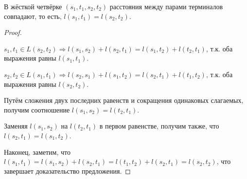 \begin{proposition} \label{eql}
В жёсткой четвёрке $(s_1, t_1, s_2, t_2)$ расстояния между парами терминалов совпадают, то есть, $l(s_1, t_1) = l(s_2, t_2)$.
\end{proposition}
\begin{proof} ~

$s_1, t_1 \in L(s_2, t_2) \Rightarrow l(s_1, s_2) + l(s_2, t_1) = l(s_1, t_2) + l(t_2, t_1)$, т.к. оба выражения равны $l(s_1, t_1)$.

$s_2, t_2 \in L(s_1, t_1) \Rightarrow l(s_2, s_1) + l(s_1, t_2) = l(s_2, t_1) + l(t_1, t_2)$, т.к. оба выражения равны $l(s_2, t_2)$.

Путём сложения двух последних равенств и сокращения одинаковых слагаемых, получим соотношение $l(s_1, s_2) = l(t_2, t_1)$. 

Заменяя $l(s_1, s_2)$ на $l(t_2, t_1)$ в первом равенстве, получим также, что $l(s_2, t_1) = l(s_1, t_2)$.

Наконец, заметим, что $l(s_1, t_1) = l(s_1, s_2) + l(s_2, t_1) = l(t_1, t_2) + l(s_2, t_1) = l(s_2, t_2)$, что завершает доказательство предложения.
\end{proof}

